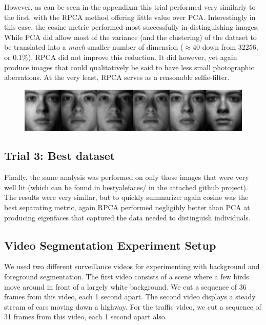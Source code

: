 \documentclass[11pt]{scrartcl} %
\theoremstyle{plain}
\begin{document}
However, as can be seen in the appendixm this trial performed very similarly to the first, with the RPCA method offering little value over PCA. Interestingly in this case, the cosine metric performed most successfully in distinguishing images. While PCA did allow most of the variance (and the clustering) of the dataset to be translated into a \emph{much} smaller  number of dimension ($\approx$40 down from 32256, or $0.1\%$), RPCA did not improve this reduction. It did however, yet again produce images that could qualitatively be said to have less small photographic aberrations. At the very least, RPCA serves as a reasonable selfie-filter.

\begin{figure}[H]
\includegraphics[width=\textwidth]{figures/person24Afterl=0dot005RPCAtrial2.jpg} 
\centering
\end{figure}

\subsection{Trial 3: Best dataset}

Finally, the same analysis was performed on only those images that were very well lit (which can be found in bestyalefaces/ in the attached github project). The results were very similar, but to quickly summarize: again cosine was the best separating metric, again RPCA performed negligibly better than PCA at producing eigenfaces that captured the data needed to distinguish individuals. 

\subsection{Video Segmentation Experiment Setup}

We used two different surveillance videos for experimenting with background and foreground segmentation. The first video consists of a scene where a few birds move around in front of a largely white background. We cut a sequence of 36 frames from this video, each 1 second apart. The second video  displays a steady stream of cars moving down a highway. For the traffic video, we cut a sequence of 31 frames from this video, each 1 second apart also. 
\end{document}
